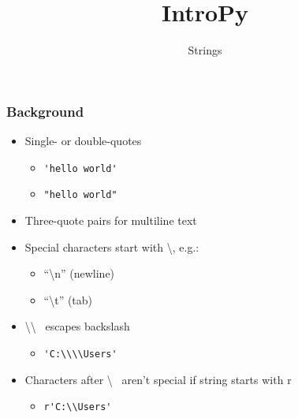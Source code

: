 \documentclass{beamer}
\title{IntroPy}
\subtitle{Strings}
\begin{document}
\frame{\titlepage}



\begin{frame}
  \frametitle{Background}
  \begin{itemize}
    \item Single- or double-quotes
      \begin{itemize}
        \item \lstinline{'hello world'} 
	\item \lstinline{"hello world"}
      \end{itemize}

    \item Three-quote pairs for multiline text

    \item Special characters start with \textbackslash, e.g.: 
      \begin{itemize}
        \item ``\textbackslash n'' (newline)
	\item ``\textbackslash t'' (tab) 
      \end{itemize}

    \item \textbackslash \textbackslash~ escapes backslash 
      \begin{itemize}
        \item \lstinline{'C:\\\\Users'}
      \end{itemize}

    \item Characters after \textbackslash~ aren't special if string starts with r
      \begin{itemize}
        \item \lstinline{r'C:\\Users'}
      \end{itemize}
 \end{itemize}
\end{frame}
\end{document}
